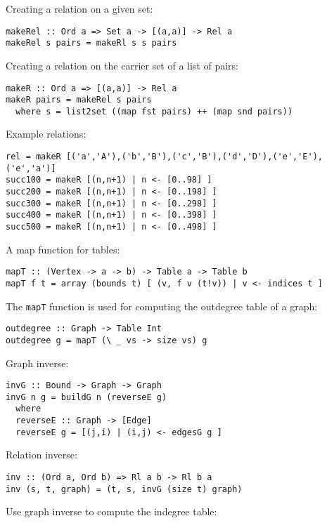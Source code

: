 Creating a relation on a given set: 

\bc\begin{verbatim}
makeRel :: Ord a => Set a -> [(a,a)] -> Rel a 
makeRel s pairs = makeRl s s pairs 
\end{verbatim}\ec

Creating a relation on the carrier set of a list of pairs: 

\bc\begin{verbatim}
makeR :: Ord a => [(a,a)] -> Rel a 
makeR pairs = makeRel s pairs  
  where s = list2set ((map fst pairs) ++ (map snd pairs))
\end{verbatim}\ec

Example relations:  

\bc\begin{verbatim}
rel = makeR [('a','A'),('b','B'),('c','B'),('d','D'),('e','E'),('e','a')]
succ100 = makeR [(n,n+1) | n <- [0..98] ]
succ200 = makeR [(n,n+1) | n <- [0..198] ]
succ300 = makeR [(n,n+1) | n <- [0..298] ]
succ400 = makeR [(n,n+1) | n <- [0..398] ]
succ500 = makeR [(n,n+1) | n <- [0..498] ]
\end{verbatim}\ec

A map function for tables: 

\bc\begin{verbatim}
mapT :: (Vertex -> a -> b) -> Table a -> Table b
mapT f t = array (bounds t) [ (v, f v (t!v)) | v <- indices t ]
\end{verbatim}\ec

The \verb^mapT^ function is used for computing the 
outdegree table of a graph: 

\bc\begin{verbatim}
outdegree :: Graph -> Table Int
outdegree g = mapT (\ _ vs -> size vs) g
\end{verbatim}\ec

Graph inverse: 

\bc\begin{verbatim}
invG :: Bound -> Graph -> Graph
invG n g = buildG n (reverseE g)
  where 
  reverseE :: Graph -> [Edge]
  reverseE g = [(j,i) | (i,j) <- edgesG g ] 
\end{verbatim}\ec

Relation inverse: 

\bc\begin{verbatim}
inv :: (Ord a, Ord b) => Rl a b -> Rl b a 
inv (s, t, graph) = (t, s, invG (size t) graph) 
\end{verbatim}\ec

Use graph inverse to compute the indegree table: 

